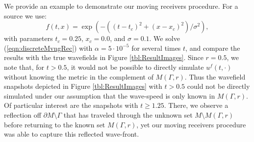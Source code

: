 \documentclass[final,leqno]{siamart1116}
\begin{document}
We provide an example to demonstrate our moving receivers
procedure. For a source we use:
\begin{equation*}
  f(t,x) = \exp\left(-((t - t_c)^2 +(x - x_c)^2)/\sigma^2\right),
\end{equation*} 
with parameters $t_c = 0.25$, $x_c = 0.0$, and $\sigma = 0.1$.  We
solve (\ref{eqn:discreteMvngRec}) with $\alpha = 5 \cdot 10^{-5}$ for
several times $t$, and compare the results with the true wavefields in
Figure \ref{tbl:ResultImages}. Since $r = 0.5$, we note that, for $t >
0.5$, it would not be possible to directly simulate $u^f(t,\cdot)$
without knowing the metric in the complement of $M(\Gamma,r)$. Thus
the wavefield snapshots depicted in Figure \ref{tbl:ResultImages} with
$t > 0.5$ could not be directly simulated under our assumption that
the wave-speed is only known in $M(\Gamma,r)$. Of particular interest
are the snapshots with $t \geq 1.25$. There, we observe a reflection
off ${\partial} M \setminus \Gamma$ that has traveled through the unknown set
$M \setminus M(\Gamma,r)$ before returning to the known set
$M(\Gamma,r)$, yet our moving receivers procedure was able to capture
this reflected wave-front.
\end{document}
